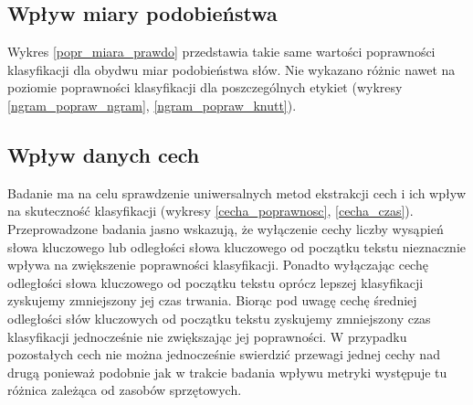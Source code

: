 \documentclass{classrep}
\begin{document}
\subsection{Wpływ miary podobieństwa}
Wykres \ref{popr_miara_prawdo} przedstawia takie same wartości poprawności klasyfikacji dla obydwu
miar podobieństwa słów. Nie wykazano różnic nawet na poziomie poprawności klasyfikacji dla poszczególnych
etykiet (wykresy \ref{ngram_popraw_ngram}, \ref{ngram_popraw_knutt}).


\subsection{Wpływ danych cech}
Badanie ma na celu sprawdzenie uniwersalnych metod ekstrakcji cech i ich wpływ na skuteczność
klasyfikacji (wykresy \ref{cecha_poprawnosc}, \ref{cecha_czas}). Przeprowadzone badania jasno wskazują,
że wyłączenie cechy liczby wysąpień słowa kluczowego lub odległości słowa kluczowego od początku tekstu
nieznacznie wpływa na zwiększenie poprawności klasyfikacji. Ponadto wyłączając cechę odległości słowa
kluczowego od początku tekstu oprócz lepszej klasyfikacji zyskujemy zmniejszony jej czas trwania.
Biorąc pod uwagę cechę średniej odległości słów kluczowych od początku tekstu zyskujemy zmniejszony
czas klasyfikacji jednocześnie nie zwiększając jej poprawności. W przypadku pozostałych cech nie można
jednocześnie swierdzić przewagi jednej cechy nad drugą ponieważ podobnie jak w trakcie badania wpływu
metryki występuje tu różnica zależąca od zasobów sprzętowych.
\end{document}
